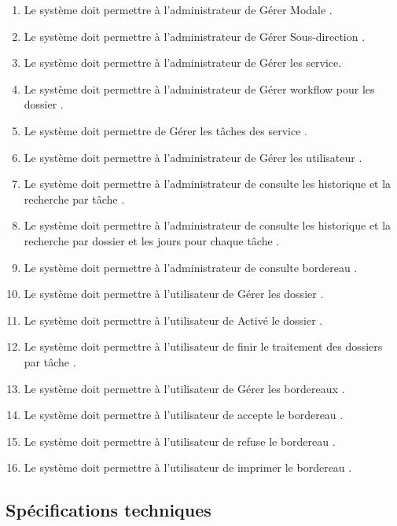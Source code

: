  \begin{enumerate}
\item  	   Le système doit permettre à l’administrateur  de  Gérer Modale .
\item  	   Le système doit permettre à l’administrateur  de  Gérer Sous-direction .
\item  	   Le système doit permettre à l’administrateur  de Gérer les service.
\item  	   Le système doit permettre à l’administrateur  de Gérer workflow pour les dossier  .
\item  	   Le système doit permettre de  Gérer les tâches des service . 
\item  	   Le système doit permettre à l’administrateur  de Gérer les utilisateur .
\item  	   Le système doit permettre à l’administrateur  de  consulte les historique  et la recherche par tâche .
\item  	   Le système doit permettre à l’administrateur  de  consulte les historique  et la recherche par dossier et les jours pour chaque tâche .
\item  	   Le système doit permettre à l’administrateur  de  consulte bordereau .
\item  	   Le système doit permettre à l’utilisateur   de  Gérer les dossier .
\item  	   Le système doit permettre à l’utilisateur   de  Activé le dossier    .
\item  	   Le système doit permettre à l’utilisateur   de  finir le traitement des dossiers par tâche    .
\item  	   Le système doit permettre à l’utilisateur   de  Gérer les  bordereaux  .
\item  	   Le système doit permettre à l’utilisateur   de  accepte le  bordereau  .
\item  	   Le système doit permettre à l’utilisateur   de  refuse  le  bordereau  .
\item  	   Le système doit permettre à l’utilisateur   de  imprimer le  bordereau  .

 \end{enumerate}
 
 
 
 
  \subsection{Spécifications techniques }
 
 
 
